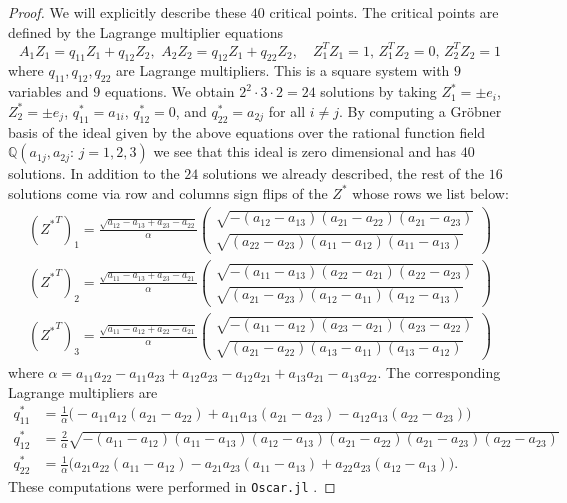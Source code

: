 \documentclass[12pt]{extarticle}
\theoremstyle{definition}
\numberwithin{theorem}{section}
\begin{document}
\begin{proof}
We will explicitly describe these $40$ critical points. The critical points are defined by the Lagrange multiplier equations 
$$A_1 Z_1 = q_{11} Z_1 + q_{12}  Z_2, \,\, A_2 Z_2 = q_{12} Z_1 + q_{22} Z_2, \quad Z_1^T Z_1 = 1,\,
Z_1^T Z_2 = 0,\, Z_2^T Z_2 = 1$$
where $q_{11}, q_{12}, q_{22}$ are Lagrange multipliers. 
This is a square system with $9$ variables and $9$ equations.
We obtain $2^2 \cdot 3 \cdot 2 = 24$ solutions by taking $Z_1^* = \pm e_i$, $Z_2^* = \pm e_j$, $q_{11}^* = a_{1i}$, $q_{12}^* = 0$, and $q_{22}^* = a_{2j}$ for all $i \neq j$. 
By computing a Gr\"obner basis of the ideal given by the above equations over the rational function field $\mathbb{Q}(a_{1j}, a_{2j}: \, j=1,2,3)$ we see that this ideal is zero dimensional and has $40$ solutions. In addition to the $24$ solutions we already described, the rest of the $16$ solutions come via row and columns sign flips of
the ${Z^*}$ whose rows we list below:
\begin{align*}
    ({Z^*}^T)_1 = \frac{\sqrt{a_{12} - a_{13} + a_{23} - a_{22}}}{\alpha}
    \begin{pmatrix}
        \sqrt{-(a_{12} - a_{13})(a_{21} - a_{22})(a_{21} - a_{23})}\\
        \sqrt{(a_{22} - a_{23})(a_{11} - a_{12})(a_{11} - a_{13})}
    \end{pmatrix}\\
    ({Z^*}^T)_2 = \frac{\sqrt{a_{11} - a_{13} + a_{23} - a_{21}}}{\alpha}
    \begin{pmatrix}
        \sqrt{-(a_{11} - a_{13})(a_{22} - a_{21})(a_{22} - a_{23})}\\
        \sqrt{(a_{21} - a_{23})(a_{12} - a_{11})(a_{12} - a_{13})}
    \end{pmatrix}\\
    ({Z^*}^T)_3 = \frac{\sqrt{a_{11} - a_{12} + a_{22} - a_{21}}}{\alpha}
    \begin{pmatrix}
        \sqrt{-(a_{11} - a_{12})(a_{23} - a_{21})(a_{23} - a_{22})}\\
        \sqrt{(a_{21} - a_{22})(a_{13} - a_{11})(a_{13} - a_{12})}
    \end{pmatrix}
\end{align*}
where $\alpha =a_{11}a_{22} - a_{11}a_{23} + a_{12}a_{23} - a_{12}a_{21} + a_{13}a_{21} - a_{13}a_{22}$.
The corresponding Lagrange multipliers are 
\begin{align*}
    q^*_{11} 
    &= \frac{1}{\alpha}\big (-a_{11}a_{12}(a_{21} - a_{22}) + a_{11}a_{13}(a_{21} - a_{23}) - a_{12}a_{13}(a_{22} - a_{23})\big )\\
    q^*_{12} 
    &=  \frac{2}{\alpha}\sqrt{-(a_{11} - a_{12})(a_{11} - a_{13})(a_{12} - a_{13})(a_{21} - a_{22})(a_{21} - a_{23})(a_{22} - a_{23})}\\
    q^*_{22}&= \frac{1}{\alpha} \big (a_{21}a_{22}(a_{11} - a_{12}) - a_{21}a_{23}(a_{11} - a_{13}) + a_{22}a_{23}(a_{12} - a_{13})\big ).
\end{align*}
These computations were performed in \verb+Oscar.jl+ \cite{oscar}.
\end{proof}
\end{document}

